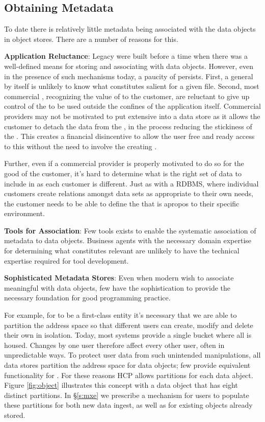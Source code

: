 
\subsection{Obtaining Metadata} \label{s:om}
To date there is relatively little metadata being associated with the data objects in object stores.  There are a number of reasons for this.

\textbf{Application Reluctance}: Legacy \apps{} were built before a time when there was a well-defined means for storing and associating \md{} with data objects. However, even in the presence of such mechanisms today, a paucity of \md{} persists. First, a general \app{} by itself is unlikely to know what constitutes salient \md{} for a given file. Second, most commercial \apps{}, recognizing the value of \md{} to the customer, are reluctant to give up control of the \md{} to be used outside the confines of the application itself. Commercial \app{} providers may not be motivated to put extensive \md{} into a data store as it allows the customer to detach the data from the \app{}, in the process reducing the stickiness of the \app{}. This creates a financial disincentive to allow the user free and ready access to this \md{} without the need to involve the creating \app{}.

Further, even if a commercial \app{} provider is properly motivated to do so for the good of the customer, it's hard to determine what is the right set of data to include in \md{} as each customer is different. Just as with a RDBMS, where individual customers create relations amongst data sets as appropriate to their own needs, the customer needs to be able to define the \md{} that is apropos to their specific environment.

\textbf{Tools for Association}: Few tools exists to enable the systematic association of metadata to data objects.  Business agents with the necessary domain expertise for determining what constitutes relevant \md{} are unlikely to have the technical expertise required for tool development.

\textbf{Sophisticated Metadata Stores}: Even when modern \apps{} wish to associate meaningful \md{} with data objects, few \oss{} have the sophistication to provide the necessary foundation for good programming practice.

For example, for \md{} to be a first-class entity it's necessary that we are able to partition the address space so that different users can create, modify and delete their own \md{} in isolation. Today, most systems provide a single bucket where all \md{} is housed. Changes by one user therefore affect every other user, often in unpredictable ways. To protect user data from such unintended manipulations, all data stores partition the address space for data objects; few provide equivalent functionality for \md{}. For these reasons HCP allows \md{} partitions for each data abject. Figure \ref{fig:object} illustrates this concept with a data object that has eight distinct \md{} partitions. In \S\ref{s:mxe} we prescribe a mechanism for users to populate these \md{} partitions for both new data ingest, as well as for existing objects already stored.


